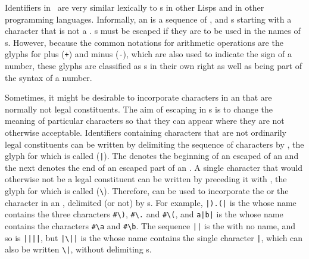\label{identifiers}
%
\begin{optDefinition}
\raggedbottom
%
Identifiers in \eulisp\ are very similar lexically to
s in other Lisps and in other programming languages.
Informally, an  is a
sequence of ,  and s
starting with a character that is not a .
s must be escaped if they are to be used in the names
of s.  However, because the common notations for arithmetic
operations are the glyphs for plus (\verb-+-) and minus (\verb+-+), which are
also used to indicate the sign of a number, these glyphs are classified as
s in their own
right as well as being part of the syntax of a number.

Sometimes, it might be desirable to incorporate characters in an
 that are normally not legal constituents.  The aim of
escaping in s is to change the meaning of particular
characters so that they can appear where they are not otherwise acceptable.
Identifiers containing characters that are not ordinarily legal constituents can
be written by delimiting the sequence of characters by , the
glyph for which is called  (\verb+|+).  The
 denotes the beginning of an escaped  of an
 and the next  denotes the end of an
escaped part of an .  A single character that would otherwise
not be a legal constituent can be written by preceding it with
, the glyph for which is called 
(\verb+\+).  Therefore,  can be used to incorporate the
 or the  character in an
, delimited (or not) by s.  For example,
\verb+|).(|+ is the  whose name contains the three characters
\verb+#\)+, \verb+#\.+ and \verb+#\(+, and \verb+a|b|+ is the 
whose name contains the characters \verb+#\a+ and \verb+#\b+.  The sequence
\verb+||+ is the  with no name, and so is \verb+||||+, but
\verb+|\||+ is the  whose name contains the single character
\verb+|+, which can also be written \verb+\|+, without delimiting
s.


\end{optDefinition}
